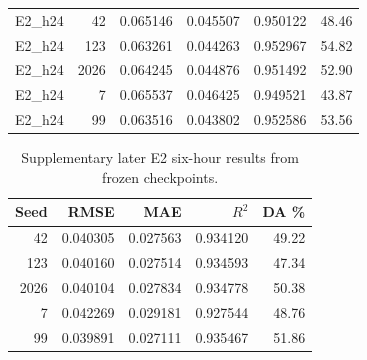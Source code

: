 \begin{table}[htbp]
\begin{tabular}{lrrrrr}
E2\_h24 & 42 & 0.065146 & 0.045507 & 0.950122 & 48.46\\
E2\_h24 & 123 & 0.063261 & 0.044263 & 0.952967 & 54.82\\
E2\_h24 & 2026 & 0.064245 & 0.044876 & 0.951492 & 52.90\\
E2\_h24 & 7 & 0.065537 & 0.046425 & 0.949521 & 43.87\\
E2\_h24 & 99 & 0.063516 & 0.043802 & 0.952586 & 53.56\\\bottomrule\end{tabular}
\end{table}

\begin{table}[htbp]\centering\small
\caption{Supplementary later E2 six-hour results from frozen checkpoints.}\label{tab:e2laterseeds}
\begin{tabular}{rrrrr}\toprule
Seed & RMSE & MAE & $R^2$ & DA \%\\\midrule
42 & 0.040305 & 0.027563 & 0.934120 & 49.22\\
123 & 0.040160 & 0.027514 & 0.934593 & 47.34\\
2026 & 0.040104 & 0.027834 & 0.934778 & 50.38\\
7 & 0.042269 & 0.029181 & 0.927544 & 48.76\\
99 & 0.039891 & 0.027111 & 0.935467 & 51.86\\\bottomrule\end{tabular}
\end{table}

